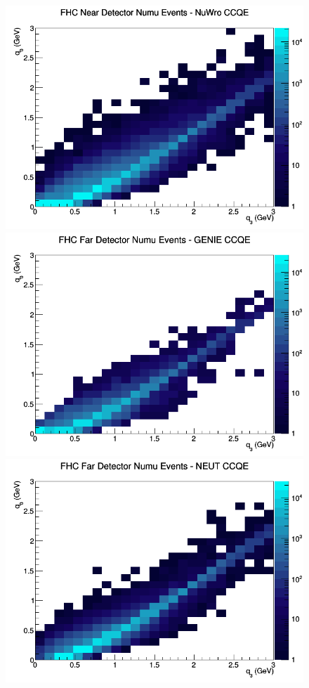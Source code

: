 \begin{figure}[h]
\includegraphics[width=\linewidth]{eff_q0_q3/GAr/CCQE_FHC_ND_numu_q3_q0_NuWro.png}
\endminipage
\newline
{}
\includegraphics[width=\linewidth]{eff_q0_q3/GAr/CCQE_FHC_FD_numu_q3_q0_GENIE.png}
\endminipage
{}
\includegraphics[width=\linewidth]{eff_q0_q3/GAr/CCQE_FHC_FD_numu_q3_q0_NEUT.png}

\end{figure}
